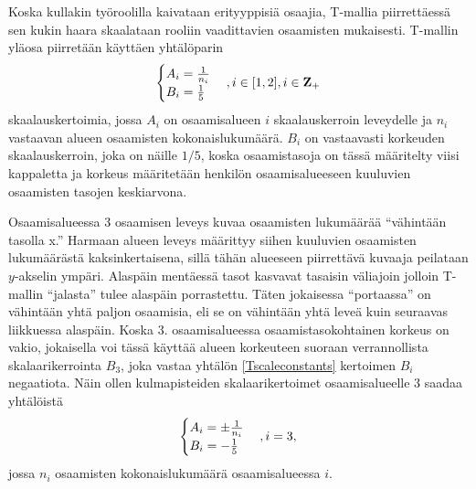 \documentclass[a4paper,finnish,12pt]{article}
\begin{document}
Koska kullakin työroolilla kaivataan erityyppisiä osaajia, T-mallia piirrettäessä sen kukin haara skaalataan rooliin vaadittavien osaamisten mukaisesti. T-mallin yläosa piirretään käyttäen yhtälöparin
\begin{equation}
\begin{cases}
A_i = \frac{1}{n_i} \\
B_i = \frac{1}{5} \\
\end{cases} \\ , i \in [1,2], i \in \mathbf{Z}_{+}
\label{Tscaleconstants}
\end{equation} skaalauskertoimia, jossa $A_i$ on osaamisalueen $i$ skaalauskerroin leveydelle ja $n_i$ vastaavan alueen osaamisten kokonaislukumäärä. $B_i$ on vastaavasti korkeuden skaalauskerroin, joka on näille $1/5$, koska osaamistasoja on tässä määritelty viisi kappaletta ja korkeus määritetään henkilön osaamisalueeseen kuuluvien osaamisten tasojen keskiarvona.

Osaamisalueessa 3 osaamisen leveys kuvaa osaamisten lukumäärää ``vähintään tasolla x.'' Harmaan alueen leveys määrittyy siihen kuuluvien osaamisten lukumäärästä kaksinkertaisena, sillä tähän alueeseen piirrettävä kuvaaja peilataan $y$-akselin ympäri. Alaspäin mentäessä tasot kasvavat tasaisin väliajoin jolloin T-mallin ``jalasta'' tulee alaspäin porrastettu. Täten jokaisessa ``portaassa'' on vähintään yhtä paljon osaamisia, eli se on vähintään yhtä leveä kuin seuraavas liikkuessa alaspäin. Koska 3. osaamisalueessa osaamistasokohtainen korkeus on vakio, jokaisella voi tässä käyttää alueen korkeuteen suoraan verrannollista skalaarikerrointa $B_3$, joka vastaa yhtälön \eqref{Tscaleconstants} kertoimen $B_i$ negaatiota. Näin ollen kulmapisteiden skalaarikertoimet osaamisalueelle 3 saadaa yhtälöistä
\begin{equation}
\begin{cases}
A_i = \pm \frac{1}{n_i} \\
B_i = - \frac{1}{5} \\
\end{cases} \\ , i = 3,
\label{Tscaleconstants3}
\end{equation} jossa $n_i$ osaamisten kokonaislukumäärä osaamisalueessa $i$.
\end{document}
